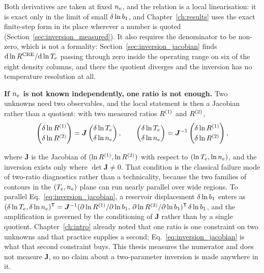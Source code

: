 \noindent Both derivatives are taken at fixed $n_e$, and the relation is a
local linearisation: it is exact only in the limit of small $\delta\ln b_1$,
and Chapter~\ref{ch:results} uses the exact finite-step form in its place
wherever a number is quoted (Section~\ref{sec:inversion_measured}). It also requires the denominator to be non-zero,
which is not a formality: Section~\ref{sec:inversion_jacobian} finds
$\mathrm{d}\ln R^{\mathrm{CRE}}/\mathrm{d}\ln T_e$ passing through zero inside the operating
range on six of the eight density columns, and there the quotient diverges and
the inversion has no temperature resolution at all.

\textbf{If $n_e$ is not known independently, one ratio is not enough.} Two
unknowns need two observables, and the local statement is then a Jacobian
rather than a quotient: with two measured ratios $R^{(1)}$ and
$R^{(2)}$,
\begin{equation}
  \begin{pmatrix}\delta\ln R^{(1)}\\[2pt]\delta\ln R^{(2)}\end{pmatrix}
  = \bm{J}\begin{pmatrix}\delta\ln T_e\\[2pt]\delta\ln n_e\end{pmatrix},
  \qquad
  \begin{pmatrix}\delta\ln T_e\\[2pt]\delta\ln n_e\end{pmatrix}
  = \bm{J}^{-1}\begin{pmatrix}\delta\ln R^{(1)}\\[2pt]\delta\ln R^{(2)}\end{pmatrix},
  \label{eq:inversion_2x2}
\end{equation}

\noindent where $\bm{J}$ is the Jacobian of $(\ln R^{(1)},\ln R^{(2)})$
with respect to $(\ln T_e,\ln n_e)$, and the inversion exists only where
$\det\bm{J} \ne 0$. That condition is the classical failure mode of
two-ratio diagnostics rather than a technicality, because the two families of
contours in the $(T_e,n_e)$ plane can run nearly parallel over wide regions.
To parallel Eq.~\eqref{eq:inversion_jacobian}, a reservoir displacement
$\delta\ln b_1$ enters as
$(\delta\ln T_e, \delta\ln n_e)^{\mathsf T} = \bm{J}^{-1}
(\partial\ln R^{(1)}/\partial\ln b_1,\,
\partial\ln R^{(2)}/\partial\ln b_1)^{\mathsf T}\,\delta\ln b_1$,
and the amplification is governed by the conditioning of $\bm{J}$
rather than by a single quotient. Chapter~\ref{ch:intro} already noted that one
ratio is one constraint on two unknowns and that practice supplies a second;
Eq.~\eqref{eq:inversion_jacobian} is what that second constraint buys.
This thesis measures the numerator and does not measure $\bm{J}$, so no claim
about a two-parameter inversion is made anywhere in it.

